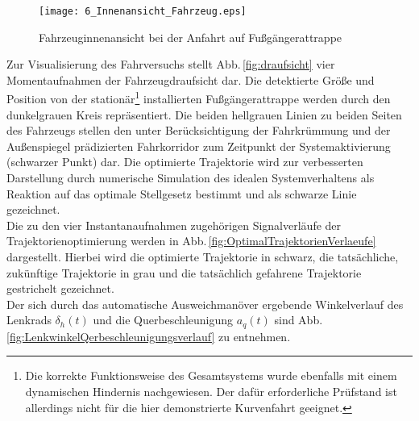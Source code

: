 \begin{figure}[!ht]
	\centering
  	\texttt{[image: 6\_Innenansicht\_Fahrzeug.eps]}
\caption[Fahrzeuginnenansicht bei der Anfahrt auf Fußgängerattrappe]{Fahrzeuginnenansicht bei der Anfahrt auf Fußgängerattrappe }
\label{fig:Innenansicht_Fahrzeug}
\end{figure}


Zur Visualisierung des Fahrversuchs stellt Abb.\,\ref{fig:draufsicht} vier Momentaufnahmen der Fahrzeugdraufsicht dar. Die detektierte Größe und Position von der stationär\footnote{Die korrekte Funktionsweise des Gesamtsystems wurde ebenfalls mit einem dynamischen Hindernis nachgewiesen. Der dafür erforderliche Prüfstand ist allerdings nicht für die hier demonstrierte Kurvenfahrt geeignet.} installierten Fußgängerattrappe werden durch den dunkelgrauen Kreis repräsentiert. Die beiden hellgrauen Linien zu beiden Seiten des Fahrzeugs stellen den unter Berücksichtigung der Fahrkrümmung und der Außenspiegel prädizierten Fahrkorridor zum Zeitpunkt der Systemaktivierung (schwarzer Punkt) dar. Die optimierte Trajektorie wird zur verbesserten Darstellung durch numerische Simulation des idealen Systemverhaltens als Reaktion auf das optimale Stellgesetz bestimmt und als schwarze Linie gezeichnet. \\
%
Die zu den vier Instantanaufnahmen zugehörigen Signalverläufe der Trajektorienoptimierung werden in Abb.\,\ref{fig:OptimalTrajektorienVerlaeufe} dargestellt. Hierbei wird die optimierte Trajektorie in schwarz, die tatsächliche, zukünftige Trajektorie in grau und die tatsächlich gefahrene Trajektorie gestrichelt gezeichnet. \\
%
Der sich durch das automatische Ausweichmanöver ergebende Winkelverlauf des Lenkrads $\delta_h(t)$ und die Querbeschleunigung $a_q(t)$ sind Abb.\,\ref{fig:LenkwinkelQerbeschleunigungsverlauf} zu entnehmen.%


